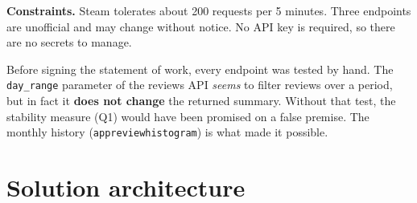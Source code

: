 \documentclass[11pt, a4paper, oneside, headings=normal, numbers=noenddot, DIV=12]{scrartcl}
\begin{document}
\textbf{Constraints.} Steam tolerates about 200 requests per 5 minutes. Three endpoints are unofficial and may change without
notice. No API key is required, so there are no secrets to manage.

\begin{keybox}
Before signing the statement of work, every endpoint was tested by hand. The \texttt{day\_range} parameter of the reviews API
\emph{seems} to filter reviews over a period, but in fact it \textbf{does not change} the returned summary. Without that test, the
stability measure (Q1) would have been promised on a false premise. The monthly history (\texttt{appreviewhistogram}) is what made it possible.
\end{keybox}

\section{Solution architecture}
\end{document}
